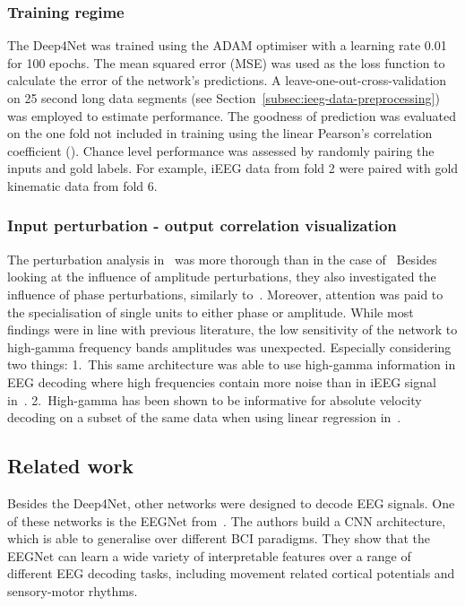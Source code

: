 \subsubsection{Training regime}
The Deep4Net was trained using the ADAM optimiser with a learning rate 0.01 for 100 epochs.
The mean squared error (MSE) was used as the loss function to calculate the error of the network's predictions.
A leave-one-out-cross-validation on 25 second long data segments (see Section~\ref{subsec:ieeg-data-preprocessing}) was employed to estimate performance.
The goodness of prediction was evaluated on the one fold not included in training using the linear Pearson's correlation coefficient (\cite{pearson-vii-1895}).
Chance level performance was assessed by randomly pairing the inputs and gold labels.
For example, iEEG data from fold 2 were paired with gold kinematic data from fold 6.

\subsubsection{Input perturbation - output correlation visualization}
The perturbation analysis in~\cite{Hammer-2021} was more thorough than in the case of~\cite{schirrmeister-deep-2017}
Besides looking at the influence of amplitude perturbations, they also investigated the influence of phase perturbations, similarly to~\cite{hartmann-hierarchical-2018}.
Moreover, attention was paid to the specialisation of single units to either phase or amplitude.
While most findings were in line with previous literature, the low sensitivity of the network to high-gamma frequency bands amplitudes was unexpected.
Especially considering two things: 
1.~This same architecture was able to use high-gamma information in EEG decoding where high frequencies contain more noise than in iEEG signal in~\cite{schirrmeister-deep-2017}.
2.~High-gamma has been shown to be informative for absolute velocity decoding on a subset of the same data when using linear regression in~\cite{hammer-predominance-2016}.


\subsection{Related work}
Besides the Deep4Net, other networks were designed to decode EEG signals.
One of these networks is the EEGNet from~\cite{lawhern-eegnet-2018}.
The authors build a CNN architecture, which is able to generalise over different BCI paradigms.
They show that the EEGNet can learn a wide variety of interpretable features over a range of different EEG decoding tasks, including movement related cortical potentials and sensory-motor rhythms.

